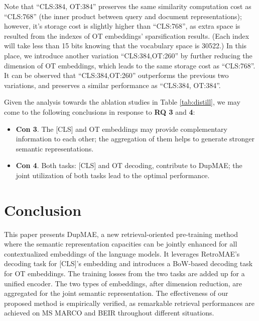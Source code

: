 \documentclass[11pt,a4paper]{article}
\begin{document}
Note that ``CLS:384, OT:384'' preserves the same similarity computation cost as ``CLS:768'' (the inner product between query and document representations); however, it's storage cost is slightly higher than ``CLS:768'', as extra space is resulted from the indexes of OT embeddings' sparsification results. (Each index will take less than 15 bits knowing that the vocabulary space is 30522.) In this place, we introduce another variation ``CLS:384,OT:260'' by further reducing the dimension of OT embeddings, which leads to the same storage cost as ``CLS:768''. It can be observed that ``CLS:384,OT:260'' outperforms the previous two variations, and preserves a similar performance as ``CLS:384, OT:384''. 

Given the analysis towards the ablation studies in Table \ref{tab:distill}, we may come to the following conclusions in response to \textbf{RQ 3} and \textbf{4}: 
\begin{itemize}
    \item \textbf{Con 3}. The [CLS] and OT embeddings may provide complementary information to each other; the aggregation of them helps to generate stronger semantic representations. 
    \item \textbf{Con 4}. Both tasks: [CLS] and OT decoding, contribute to DupMAE; the joint utilization of both tasks lead to the optimal performance.   
\end{itemize} 








\section{Conclusion} 
This paper presents DupMAE, a new retrieval-oriented pre-training method where the semantic representation capacities can be jointly enhanced for all contextualized embeddings of the language models. It leverages RetroMAE's decoding task for [CLS]'s embedding and introduces a BoW-based decoding task for OT embeddings. The training losses from the two tasks are added up for a unified encoder. The two types of embeddings, after dimension reduction, are aggregated for the joint semantic representation. The effectiveness of our proposed method is empirically verified, as remarkable retrieval performances are achieved on MS MARCO and BEIR throughout different situations. 



\newpage


\end{document}
